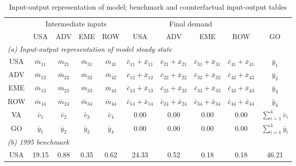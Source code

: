 \begin{table}[p]
\renewcommand{\arraystretch}{1.2}
\begin{center}
\begin{threeparttable}
\caption{Input-output representation of model; benchmark and counterfactual input-output tables}
\label{tab:iomat-bench}
\small
\begin{tabular}{cccccccccc}
\toprule
& \multicolumn{4}{c}{Intermediate inputs}& \multicolumn{4}{c}{Final demand} & \\
\cmidrule(rl){2-5}\cmidrule(rl){6-9}
 &\multicolumn{1}{p{1.25cm}}{\centering USA} &\multicolumn{1}{p{1.25cm}}{\centering ADV} &\multicolumn{1}{p{1.25cm}}{\centering EME} &\multicolumn{1}{p{1.25cm}}{\centering ROW} &\multicolumn{1}{p{1.25cm}}{\centering USA} &\multicolumn{1}{p{1.25cm}}{\centering ADV} &\multicolumn{1}{p{1.25cm}}{\centering EME} &\multicolumn{1}{p{1.25cm}}{\centering ROW}& \multicolumn{1}{p{1.25cm}}{\centering GO}\\
\midrule
\multicolumn{10}{l}{\textit{(a) Input-output representation of model steady state}} \\
USA& $\bar{m}_{11}$  & $\bar{m}_{21}$  & $\bar{m}_{31}$ & $\bar{m}_{41}$ & $\bar{c}_{11}+\bar{x}_{11}$ & $\bar{c}_{21}+\bar{x}_{21}$ & $\bar{c}_{31}+\bar{x}_{31}$ & $\bar{c}_{41}+\bar{x}_{41}$ & $\bar{y}_1$ \\
ADV& $\bar{m}_{12}$  & $\bar{m}_{22}$  & $\bar{m}_{32}$ & $\bar{m}_{42}$ & $\bar{c}_{12}+\bar{x}_{12}$ & $\bar{c}_{22}+\bar{x}_{22}$ & $\bar{c}_{32}+\bar{x}_{32}$ & $\bar{c}_{42}+\bar{x}_{42}$ & $\bar{y}_2$ \\
EME& $\bar{m}_{13}$  & $\bar{m}_{23}$  & $\bar{m}_{33}$ & $\bar{m}_{43}$ & $\bar{c}_{13}+\bar{x}_{13}$ & $\bar{c}_{23}+\bar{x}_{23}$ & $\bar{c}_{33}+\bar{x}_{33}$ & $\bar{c}_{43}+\bar{x}_{43}$ & $\bar{y}_3$ \\
ROW& $\bar{m}_{14}$  & $\bar{m}_{24}$  & $\bar{m}_{34}$ & $\bar{m}_{44}$ & $\bar{c}_{14}+\bar{x}_{14}$ & $\bar{c}_{24}+\bar{x}_{24}$ & $\bar{c}_{34}+\bar{x}_{34}$ & $\bar{c}_{44}+\bar{x}_{44}$ & $\bar{y}_4$ \\
VA& $\bar{v}_1$ & $\bar{v}_2$ & $\bar{v}_3$ & $\bar{v}_4$ & 0.00& 0.00& 0.00& 0.00& $\sum_{i=1}^4 \bar{v}_i$ \\
GO& $\bar{y}_1$ & $\bar{y}_2$ & $\bar{y}_3$ & $\bar{y}_4$ & 0.00& 0.00& 0.00& 0.00& $\sum_{i=1}^4 \bar{y}_i$ \\
\midrule
\multicolumn{10}{l}{\textit{(b) 1995 benchmark}} \\
USA& 19.15& 0.88& 0.35& 0.62& 24.33& 0.52& 0.18& 0.18& 46.21 \\

\end{tabular}
\end{threeparttable}
\end{center}
\end{table}
